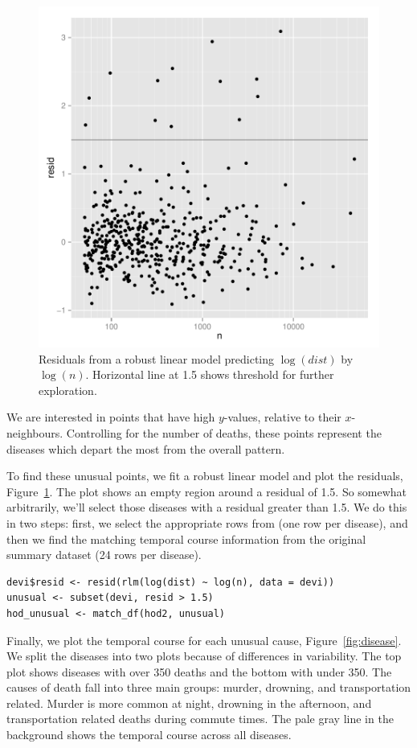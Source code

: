 \documentclass[article]{jss}
\begin{document}
\begin{figure}[htbp]
  \centering
    \includegraphics[width=0.5\linewidth]{case-study/n-dist-resid}
  \caption{Residuals from a robust linear model predicting $\log(dist)$ by $\log(n)$. Horizontal line at 1.5 shows threshold for further exploration.}
  \label{fig:devi-resid}
\end{figure}

We are interested in points that have high $y$-values, relative to their $x$-neighbours. Controlling for the number of deaths, these points represent the diseases which depart the most from the overall pattern.

To find these unusual points, we fit a robust linear model and plot the residuals,  Figure~\ref{fig:devi-resid}. The plot shows an empty region around a residual of 1.5. So somewhat arbitrarily, we'll select those diseases with a residual greater than 1.5. We do this in two steps: first, we select the appropriate rows from  (one row per disease), and then we find the matching temporal course information from the original summary dataset (24 rows per disease).

\begin{Verbatim}
devi$resid <- resid(rlm(log(dist) ~ log(n), data = devi))
unusual <- subset(devi, resid > 1.5)
hod_unusual <- match_df(hod2, unusual)
\end{Verbatim}

Finally, we plot the temporal course for each unusual cause, Figure~\ref{fig:disease}. We split the diseases into two plots because of differences in variability. The top plot shows diseases with over 350 deaths and the bottom with under 350. The causes of death fall into three main groups: murder, drowning, and transportation related. Murder is more common at night, drowning in the afternoon, and transportation related deaths during commute times. The pale gray line in the background shows the temporal course across all diseases.
\end{document}
